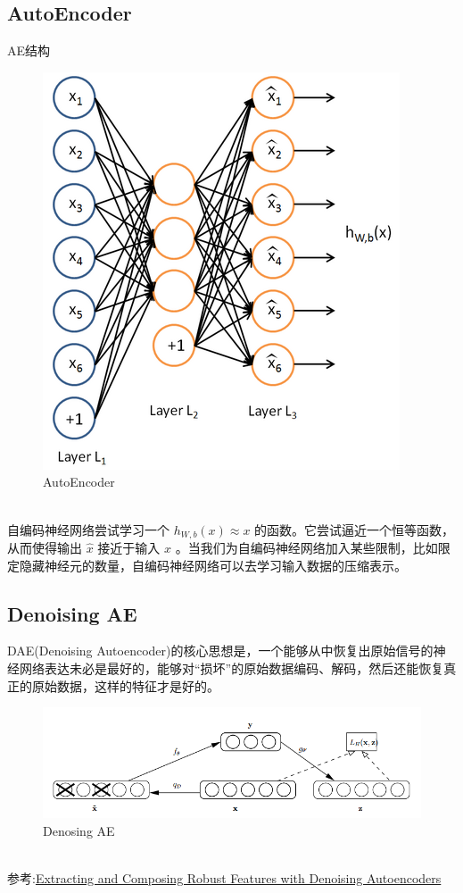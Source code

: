 \documentclass{article}
\begin{document}
\subsection{AutoEncoder}
AE结构
\begin{figure}[h]
\centering
\includegraphics[height=0.5\linewidth]{4.png}
\caption{AutoEncoder}
\end{figure}\\
自编码神经网络尝试学习一个 $\textstyle h_{W,b}(x) \approx x$ 的函数。它尝试逼近一个恒等函数，从而使得输出 $\textstyle \hat{x}$ 接近于输入 $\textstyle x$ 。当我们为自编码神经网络加入某些限制，比如限定隐藏神经元的数量，自编码神经网络可以去学习输入数据的压缩表示。
\subsection{Denoising AE}
DAE(Denoising Autoencoder)的核心思想是，一个能够从中恢复出原始信号的神经网络表达未必是最好的，能够对“损坏”的原始数据编码、解码，然后还能恢复真正的原始数据，这样的特征才是好的。
\begin{figure}[h]
\centering
\includegraphics[width=0.8\linewidth]{5.png}
\caption{Denosing AE}
\end{figure}\\
参考:\href{https://www.researchgate.net/publication/221346269_Extracting_and_composing_robust_features_with_denoising_autoencoders}{Extracting and Composing Robust Features with
Denoising Autoencoders}
\end{document}

